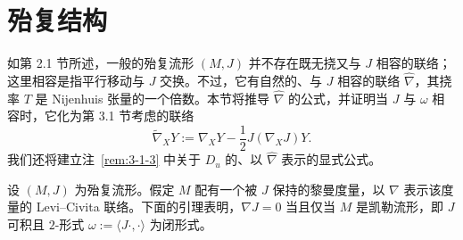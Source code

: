 
\section{殆复结构}\label{sec:C-7}

如第 2.1 节所述，一般的殆复流形 $(M,J)$ 并不存在既无挠又与 $J$ 相容的联络；这里相容是指平行移动与 $J$ 交换。不过，它有自然的、与 $J$ 相容的联络 $\widehat\nabla$，其挠率 $T$ 是 Nijenhuis 张量的一个倍数。本节将推导 $\widehat\nabla$ 的公式，并证明当 $J$ 与 $\omega$ 相容时，它化为第 3.1 节考虑的联络
\[
  \widetilde\nabla_XY:=\nabla_XY-\frac12J(\nabla_XJ)Y.
\]
我们还将建立注~\ref{rem:3-1-3} 中关于 $D_u$ 的、以 $\widehat\nabla$ 表示的显式公式。

设 $(M,J)$ 为殆复流形。假定 $M$ 配有一个被 $J$ 保持的黎曼度量，以 $\nabla$ 表示该度量的 Levi--Civita 联络。下面的引理表明，$\nabla J=0$ 当且仅当 $M$ 是凯勒流形，即 $J$ 可积且 $2$-形式 $\omega:=\langle J\cdot,\cdot\rangle$ 为闭形式。

